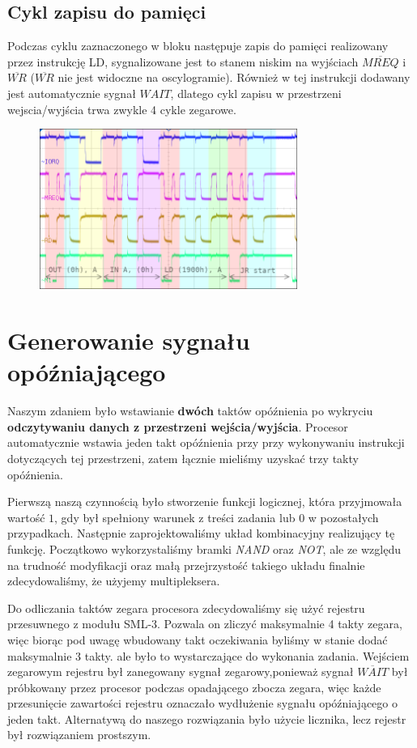 \documentclass[fleqn]{article}
\newcommand\square[1]{
	\fcolorbox{black}{#1}{\rule{0pt}{6pt}\rule{6pt}{0pt}}
}
\begin{document}
\subsection{Cykl zapisu do pamięci}
Podczas cyklu zaznaczonego w bloku \square{green} następuje zapis do pamięci realizowany przez instrukcję LD, sygnalizowane jest to stanem niskim na wyjściach $\overline{MREQ}$ i $\overline{WR}$ ($\overline{WR}$ nie jest widoczne na oscylogramie). Również w tej instrukcji dodawany jest automatycznie sygnał ${WAIT}$, dlatego cykl zapisu w przestrzeni wejscia/wyjścia trwa zwykle 4 cykle zegarowe.

\begin{figure}[H]
	\centering
	\includegraphics[width=0.75\textwidth]{img/1a.png}
	\caption{}
\end{figure}

\section{Generowanie sygnału opóźniającego}

Naszym zdaniem było wstawianie \textbf{dwóch} taktów opóźnienia po wykryciu \textbf{odczytywaniu danych z przestrzeni wejścia/wyjścia}. Procesor automatycznie wstawia jeden takt opóźnienia przy przy wykonywaniu instrukcji dotyczących tej przestrzeni, zatem łącznie mieliśmy uzyskać trzy takty opóźnienia.

Pierwszą naszą czynnością było stworzenie funkcji logicznej, która przyjmowała wartość $1$, gdy był spełniony warunek z treści zadania lub $0$ w pozostałych przypadkach. Następnie zaprojektowaliśmy układ kombinacyjny realizujący tę funkcję. Początkowo wykorzystaliśmy bramki \textit{NAND} oraz \textit{NOT}, ale ze względu na trudność modyfikacji oraz małą przejrzystość takiego układu finalnie zdecydowaliśmy, że użyjemy multipleksera.

Do odliczania taktów zegara procesora zdecydowaliśmy się użyć rejestru przesuwnego z modułu SML-3. Pozwala on zliczyć maksymalnie 4 takty zegara, więc biorąc pod uwagę wbudowany takt oczekiwania byliśmy w stanie dodać maksymalnie 3 takty. ale było to wystarczające do wykonania zadania. Wejściem zegarowym rejestru był zanegowany sygnał zegarowy,ponieważ sygnał $\overline{WAIT}$ był próbkowany przez procesor podczas opadającego zbocza zegara, więc każde przesunięcie zawartości rejestru oznaczało wydłużenie sygnału opóźniającego o jeden takt.  Alternatywą do naszego rozwiązania było użycie licznika, lecz rejestr był rozwiązaniem prostszym.
\end{document}
